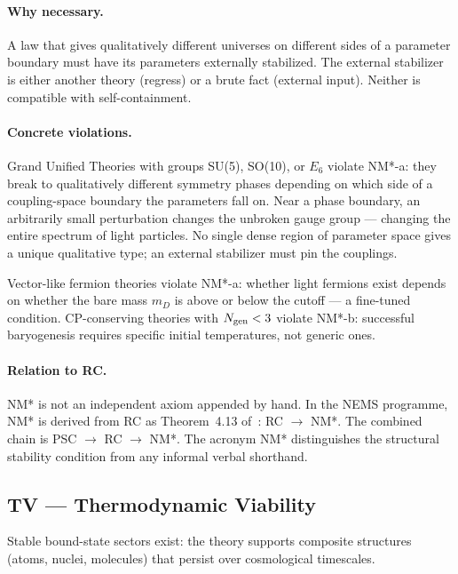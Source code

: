 \documentclass[11pt,openany]{book}
\theoremstyle{remark}
\begin{document}
\paragraph{Why necessary.}
A law that gives qualitatively different universes on different sides of a parameter
boundary must have its parameters externally stabilized. The external stabilizer is
either another theory (regress) or a brute fact (external input). Neither is
compatible with self-containment.

\paragraph{Concrete violations.}
Grand Unified Theories with groups SU(5), SO(10), or $E_6$ violate NM*-a: they break
to qualitatively different symmetry phases depending on which side of a
coupling-space boundary the parameters fall on. Near a phase boundary, an arbitrarily
small perturbation changes the unbroken gauge group --- changing the entire spectrum
of light particles. No single dense region of parameter space gives a unique
qualitative type; an external stabilizer must pin the couplings.

Vector-like fermion theories violate NM*-a: whether light fermions exist depends on
whether the bare mass $m_D$ is above or below the cutoff --- a fine-tuned condition.
CP-conserving theories with $N_{\rm gen} < 3$ violate NM*-b: successful baryogenesis
requires specific initial temperatures, not generic ones.

\paragraph{Relation to RC.}
NM* is not an independent axiom appended by hand. In the NEMS programme, NM* is
derived from RC as Theorem~4.13 of~\cite{SpivackNEMS05}: RC $\to$ NM*. The combined
chain is PSC $\to$ RC $\to$ NM*. The acronym NM* distinguishes the structural
stability condition from any informal verbal shorthand.

\subsection*{TV --- Thermodynamic Viability}

\begin{tcolorbox}[colback=green!5,colframe=green!50!black,
  title={Definition: TV --- Thermodynamic Viability}]
Stable bound-state sectors exist: the theory supports composite structures (atoms,
nuclei, molecules) that persist over cosmological timescales.
\end{tcolorbox}
\end{document}
